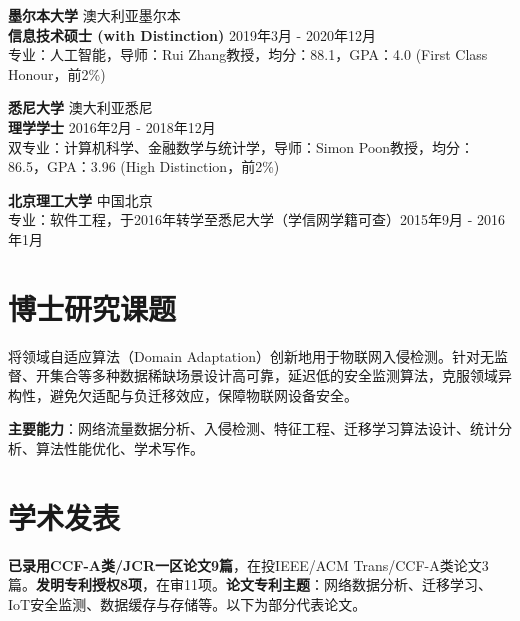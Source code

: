 \documentclass[UTF8,letterpaper,10.9pt]{article}
\begin{document}
\vspace{9pt}

\textbf{墨尔本大学} \hfill 澳大利亚墨尔本\\
\textbf{信息技术硕士 (with Distinction)} \hfill 2019年3月 - 2020年12月\\
专业：人工智能，导师：Rui Zhang教授，均分：88.1，GPA：4.0 (First Class Honour，前2\%)

\vspace{9pt}

\textbf{悉尼大学} \hfill 澳大利亚悉尼\\
\textbf{理学学士} \hfill 2016年2月 - 2018年12月\\
双专业：计算机科学、金融数学与统计学，导师：Simon Poon教授，均分：86.5，GPA：3.96 (High Distinction，前2\%)

\vspace{9pt}

\textbf{北京理工大学} \hfill 中国北京\\
专业：软件工程，于2016年转学至悉尼大学（学信网学籍可查）\hfill 2015年9月 - 2016年1月\\

\vspace{1pt}




\section{\textbf{博士研究课题}}

将领域自适应算法（Domain Adaptation）创新地用于物联网入侵检测。针对无监督、开集合等多种数据稀缺场景设计高可靠，延迟低的安全监测算法，克服领域异构性，避免欠适配与负迁移效应，保障物联网设备安全。

\textbf{主要能力}：网络流量数据分析、入侵检测、特征工程、迁移学习算法设计、统计分析、算法性能优化、学术写作。

\vspace{1pt}




\section{\textbf{学术发表}}

\textbf{已录用CCF-A类/JCR一区论文9篇}，在投IEEE/ACM Trans/CCF-A类论文3篇。\textbf{发明专利授权8项}，在审11项。\textbf{论文专利主题}：网络数据分析、迁移学习、IoT安全监测、数据缓存与存储等。以下为部分代表论文。
\end{document}
